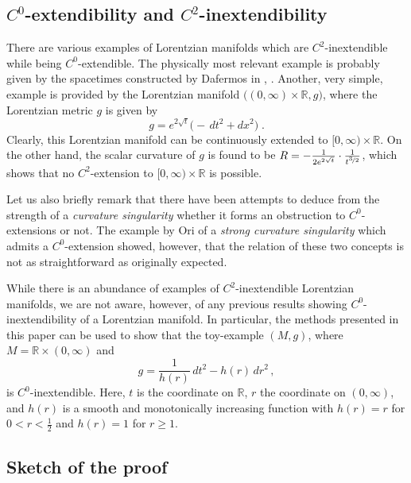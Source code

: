 \documentclass[reqno]{article}
\newcommand{\R}{\mathbb{R}}
\begin{document}
\subsection{$C^0$-extendibility and $C^2$-inextendibility}

There are various examples of Lorentzian manifolds which are $C^2$-inextendible while being $C^0$-extendible. The physically most relevant example is probably given by the spacetimes constructed by Dafermos in \cite{Daf03}, \cite{Daf05a}. Another, very simple, example is provided by the Lorentzian manifold $\big((0, \infty) \times \R ,g\big)$, where the Lorentzian metric $g$ is given by 
\begin{equation*}
g = e^{2 \sqrt{t}} \big(-\, dt^2 + dx^2\big)\;.
\end{equation*}
Clearly, this Lorentzian manifold can be continuously extended to $[0, \infty) \times \R$. On the other hand, the scalar curvature of $g$ is found to be $R = - \frac{1}{2 e^{2\sqrt{t}}} \cdot \frac{1}{t^{\nicefrac{3}{2}}}$, which shows that no $C^2$-extension to $[0, \infty) \times \R$ is possible.

Let us also briefly remark that there have been attempts to deduce from the strength of a \emph{curvature singularity} whether it forms an obstruction to $C^0$-extensions or not. The example \cite{Ori00} by Ori of a \emph{strong curvature singularity} which admits a $C^0$-extension showed, however, that the relation of these two concepts is not as straightforward as originally expected. 

While there is an abundance of examples of $C^2$-inextendible Lorentzian manifolds, we are not aware, however, of any previous results showing $C^0$-inextendibility of a Lorentzian manifold. In particular, the methods presented in this paper can be used to show that the toy-example $(M,g)$, where $M = \R \times (0, \infty)$ and
\begin{equation*}
g = \frac{1}{h(r)} \, dt^2 - h(r) \, dr^2 \,,
\end{equation*}
is $C^0$-inextendible. Here, $t$ is the coordinate on $\R$, $r$ the coordinate on $(0,\infty)$, and $h(r)$ is a smooth and monotonically increasing function with $h(r) = r$ for $0<r< \frac{1}{2}$ and $h(r) = 1$ for $r \geq 1$.



\subsection{Sketch of the proof}
\end{document}
